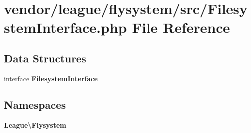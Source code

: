 \section{vendor/league/flysystem/src/\+Filesystem\+Interface.php File Reference}
\label{_filesystem_interface_8php}
\subsection*{Data Structures}
\begin{DoxyCompactItemize}
\item 
interface {\bf Filesystem\+Interface}
\end{DoxyCompactItemize}
\subsection*{Namespaces}
\begin{DoxyCompactItemize}
\item 
 {\bf League\textbackslash{}\+Flysystem}
\end{DoxyCompactItemize}
